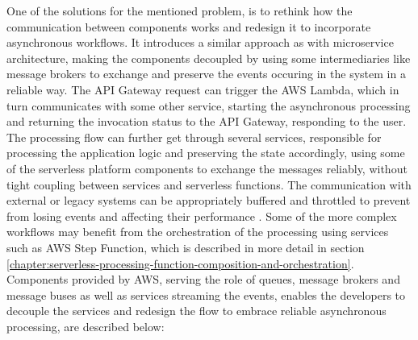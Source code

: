 One of the solutions for the mentioned problem, is to rethink how the communication between components works and redesign it to incorporate asynchronous workflows.
It introduces a similar approach as with microservice architecture, making the components decoupled by using some intermediaries like message brokers to exchange and preserve the events occuring in the system in a reliable way.
The API Gateway request can trigger the AWS Lambda, which in turn communicates with some other service, starting the asynchronous processing and returning the invocation status to the API Gateway, responding to the user.
The processing flow can further get through several services, responsible for processing the application logic and preserving the state accordingly, using some of the serverless platform components to exchange the messages reliably, without tight coupling between services and serverless functions.
The communication with external or legacy systems can be appropriately buffered and throttled to prevent from losing events and affecting their performance \cite{ServerlessAtScaleDesignPatternsAndOptimizations}.
Some of the more complex workflows may benefit from the orchestration of the processing using services such as AWS Step Function, which is described in more detail in section \ref{chapter:serverless-processing-function-composition-and-orchestration}. \\

Components provided by AWS, serving the role of queues, message brokers and message buses as well as services streaming the events, enables the developers to decouple the services and redesign the flow to embrace reliable asynchronous processing, are described below:

